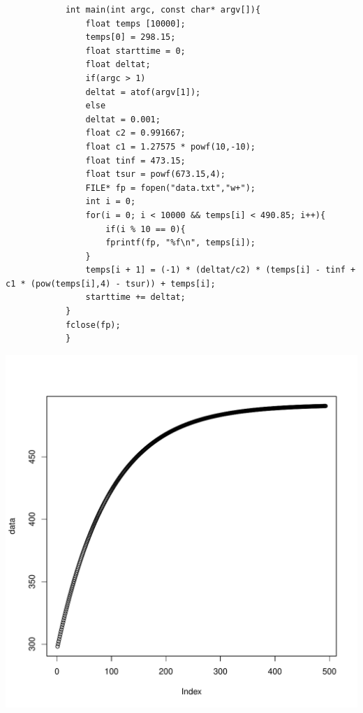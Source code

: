 \documentclass{hw}
\begin{document}
\begin{enumerate}
\begin{verbatim}
	      	int main(int argc, const char* argv[]){
	      		float temps [10000];
	      		temps[0] = 298.15;
	      		float starttime = 0;
	      		float deltat;
	      		if(argc > 1)
	      		deltat = atof(argv[1]);
	      		else
	      		deltat = 0.001;
	      		float c2 = 0.991667;
	      		float c1 = 1.27575 * powf(10,-10);
	      		float tinf = 473.15;
	      		float tsur = powf(673.15,4);
	      		FILE* fp = fopen("data.txt","w+");
	      		int i = 0;
	      		for(i = 0; i < 10000 && temps[i] < 490.85; i++){
	      			if(i % 10 == 0){
	      			fprintf(fp, "%f\n", temps[i]);
	      		}
	      		temps[i + 1] = (-1) * (deltat/c2) * (temps[i] - tinf + c1 * (pow(temps[i],4) - tsur)) + temps[i];
	      		starttime += deltat;
	      	}
	      	fclose(fp);
	      	}
	      \end{verbatim}
	      \includegraphics[scale=0.3]{Rplots}


\end{enumerate}
\end{document}
